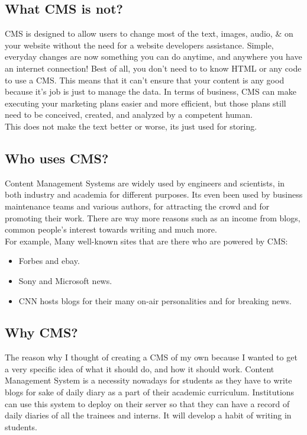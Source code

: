 \subsection{What CMS is not?}
CMS is designed to allow users to change most of the text, images, audio, & on your website without the need for a website developers assistance. Simple, everyday changes are now something you can do anytime, and anywhere you have an internet connection! Best of all, you don't need to to know HTML or any code to use a CMS.
This means that it can't ensure that your content is any good because it's job is just to manage the data. In terms of business, CMS can make executing your marketing plans easier and more efficient, but those plans still need to be conceived, created, and analyzed by a competent human. \\
This does not make the text better or worse, its just used for storing.
\subsection{Who uses CMS?}
Content Management Systems are widely used by engineers and scientists, in both industry and
academia for different purposes. Its even been used by business maintenance teams and various authors, for attracting the crowd and for promoting their work. There are way more reasons such as an income from blogs, common people's interest towards writing and much more.\\
 For example, Many well-known sites that are there who are powered by CMS:
\begin{itemize}
\item Forbes and ebay.
\item Sony and Microsoft news.
\item CNN hosts blogs for their many on-air personalities and for breaking news.
\end{itemize}
\subsection{Why CMS?}
The reason why I thought of creating a CMS of my own because I wanted to get a very specific idea of what it should do, and how it should work. Content Management System is a necessity nowadays for students as they have to write blogs for sake of daily diary as a part of their academic curriculum. Institutions can use this system to deploy on their server so that they can have a record of daily diaries of all the trainees and interns. It will develop a habit of writing in students. 

